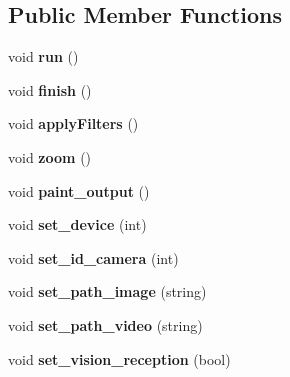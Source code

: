 \subsection*{Public Member Functions}
\begin{DoxyCompactItemize}
\item 
void {\bfseries run} ()\hypertarget{classcalibration_a4b435b278f024e919b733627884ba0d2}{}\label{classcalibration_a4b435b278f024e919b733627884ba0d2}

\item 
void {\bfseries finish} ()\hypertarget{classcalibration_a01c20860fb99a2370c191b0228e82af4}{}\label{classcalibration_a01c20860fb99a2370c191b0228e82af4}

\item 
void {\bfseries apply\+Filters} ()\hypertarget{classcalibration_a17edbce9454069eaa50cc84aa1cb34fd}{}\label{classcalibration_a17edbce9454069eaa50cc84aa1cb34fd}

\item 
void {\bfseries zoom} ()\hypertarget{classcalibration_af2cc271619bd9d5c0e72ebbbf1b83f39}{}\label{classcalibration_af2cc271619bd9d5c0e72ebbbf1b83f39}

\item 
void {\bfseries paint\+\_\+output} ()\hypertarget{classcalibration_a9d29a622f2412fcf5cb654444d1bd43e}{}\label{classcalibration_a9d29a622f2412fcf5cb654444d1bd43e}

\item 
void {\bfseries set\+\_\+device} (int)\hypertarget{classcalibration_adba399584f906544ce09309e5539bb84}{}\label{classcalibration_adba399584f906544ce09309e5539bb84}

\item 
void {\bfseries set\+\_\+id\+\_\+camera} (int)\hypertarget{classcalibration_aee45977e438474eb1111964a827a8ff9}{}\label{classcalibration_aee45977e438474eb1111964a827a8ff9}

\item 
void {\bfseries set\+\_\+path\+\_\+image} (string)\hypertarget{classcalibration_a2eacc8d2c839f71182d3ec0440056ee7}{}\label{classcalibration_a2eacc8d2c839f71182d3ec0440056ee7}

\item 
void {\bfseries set\+\_\+path\+\_\+video} (string)\hypertarget{classcalibration_ac4b64b95163be3bfdfb13c2d23592756}{}\label{classcalibration_ac4b64b95163be3bfdfb13c2d23592756}

\item 
void {\bfseries set\+\_\+vision\+\_\+reception} (bool)\hypertarget{classcalibration_a5a1d0ee04511fc9a61767d3bb3f4e357}{}\label{classcalibration_a5a1d0ee04511fc9a61767d3bb3f4e357}


\end{DoxyCompactItemize}
